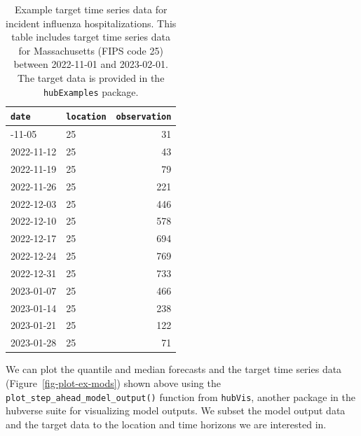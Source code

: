 \documentclass[
  letterpaper,
  DIV=11,
  numbers=noendperiod]{scrartcl}
\begin{document}
\begin{longtable}[]{@{}llr@{}}

\caption{\label{tbl-example-target-time-series-data}Example target time
series data for incident influenza hospitalizations. This table includes
target time series data for Massachusetts (FIPS code 25) between
2022-11-01 and 2023-02-01. The target data is provided in the
\texttt{hubExamples} package.}

\tabularnewline

\toprule\noalign{}
\texttt{date} & \texttt{location} & \texttt{observation} \\
\midrule\noalign{}
\endhead
\bottomrule\noalign{}
\endlastfoot
2022-11-05 & 25 & 31 \\
2022-11-12 & 25 & 43 \\
2022-11-19 & 25 & 79 \\
2022-11-26 & 25 & 221 \\
2022-12-03 & 25 & 446 \\
2022-12-10 & 25 & 578 \\
2022-12-17 & 25 & 694 \\
2022-12-24 & 25 & 769 \\
2022-12-31 & 25 & 733 \\
2023-01-07 & 25 & 466 \\
2023-01-14 & 25 & 238 \\
2023-01-21 & 25 & 122 \\
2023-01-28 & 25 & 71 \\

\end{longtable}

We can plot the quantile and median forecasts and the target time series
data (Figure~\ref{fig-plot-ex-mods}) shown above using the
\texttt{plot\_step\_ahead\_model\_output()} function from
\texttt{hubVis}, another package in the hubverse suite for visualizing
model outputs. We subset the model output data and the target data to
the location and time horizons we are interested in.
\end{document}
